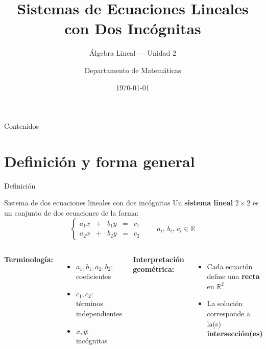 \documentclass[11pt, aspectratio=169]{beamer}
\title[Sistemas Lineales 2×2]{Sistemas de Ecuaciones Lineales\\con Dos Incógnitas}
\subtitle{Álgebra Lineal — Unidad 2}
\author[Dept. Matemáticas]{Departamento de Matemáticas}
\institute{Universidad}
\date{\today}
\newcommand{\R}{\mathbb{R}}
\begin{document}
	
	\begin{frame}[plain]
		\titlepage
	\end{frame}
	
	\begin{frame}{Contenidos}
		\tableofcontents
	\end{frame}
	
	\section{Definición y forma general}
	
	\begin{frame}{Definición}
		\begin{block}{Sistema de dos ecuaciones lineales con dos incógnitas}
			Un \textbf{sistema lineal} $2\times 2$ es un conjunto de dos ecuaciones de la forma:
			\[
			\left\{
			\begin{array}{rcrcr}
				a_1 x & + & b_1 y & = & c_1 \\[6pt]
				a_2 x & + & b_2 y & = & c_2
			\end{array}
			\right.
			\qquad a_i,\, b_i,\, c_i \in \R
			\]
		\end{block}
		
		\vspace{0.4em}
		\begin{columns}[T]
			\textbf{Terminología:}
			\begin{itemize}
				\item $a_1, b_1, a_2, b_2$: \alert{coeficientes}
				\item $c_1, c_2$: \alert{términos independientes}
				\item $x, y$: \alert{incógnitas}
			\end{itemize}
			\textbf{Interpretación geométrica:}
			\begin{itemize}
				\item Cada ecuación define una \textbf{recta} en $\R^2$
				\item La solución corresponde a la(s) \textbf{intersección(es)}
			\end{itemize}
		\end{columns}
	\end{frame}
	
\end{document}
